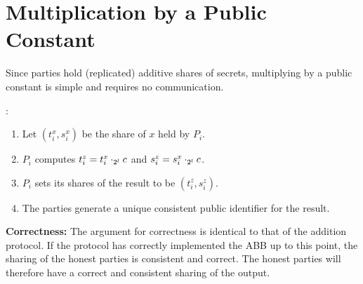 \section{Multiplication by a Public Constant}

Since parties hold (replicated) additive shares of secrets, multiplying by a public constant is simple and requires no communication.

\begin{protocol}
	:
		\begin{enumerate}
			\item Let $(t^x_i, s^x_i)$ be the share of $x$ held by $P_i$.
			\item $P_i$ computes $t^z_i = t^x_i \cdot_{2^l} c$ and $s^z_i = s^x_i \cdot_{2^l} c$.
			\item $P_i$ sets its shares of the result to be
				$(t^z_i, s^z_i)$.
			\item The parties generate a unique consistent public identifier for the result.
		\end{enumerate}
\end{protocol}

\textbf{Correctness:}
The argument for correctness is identical to that of the addition protocol.
If the protocol has correctly implemented the ABB up to this point, the sharing of the honest parties is consistent and correct.
The honest parties will therefore have a correct and consistent sharing of the output.